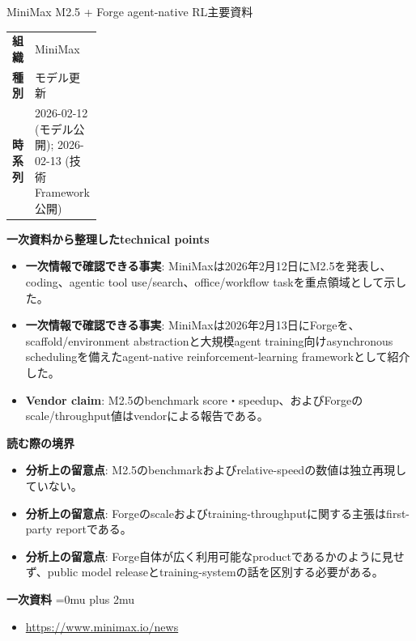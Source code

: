 \begin{technicalnote}{MiniMax M2.5 + Forge agent-native RL}{主要資料}
\begingroup
\begin{tabularx}{\linewidth}{@{}>{\bfseries}p{0.22\linewidth}X@{}}
組織 & MiniMax \\
種別 & モデル更新 \\
時系列 & 2026-02-12 (モデル公開); 2026-02-13 (技術Framework公開) \\
\end{tabularx}
\smallskip
{\bfseries 一次資料から整理したtechnical points}
\begin{itemize}[leftmargin=1.5em,itemsep=0.35em]
\item \textbf{一次情報で確認できる事実}: MiniMaxは2026年2月12日にM2.5を発表し、coding、agentic tool use/search、office/workflow taskを重点領域として示した。
\item \textbf{一次情報で確認できる事実}: MiniMaxは2026年2月13日にForgeを、scaffold/environment abstractionと大規模agent training向けasynchronous schedulingを備えたagent-native reinforcement-learning frameworkとして紹介した。
\item \textbf{Vendor claim}: M2.5のbenchmark score・speedup、およびForgeのscale/throughput値はvendorによる報告である。
\end{itemize}
\begin{minipage}{\linewidth}
{\bfseries 読む際の境界}
\begin{itemize}[leftmargin=1.5em,itemsep=0.35em]
\item \textbf{分析上の留意点}: M2.5のbenchmarkおよびrelative-speedの数値は独立再現していない。
\item \textbf{分析上の留意点}: Forgeのscaleおよびtraining-throughputに関する主張はfirst-party reportである。
\item \textbf{分析上の留意点}: Forge自体が広く利用可能なproductであるかのように見せず、public model releaseとtraining-systemの話を区別する必要がある。
\end{itemize}
\begin{samepage}
{\bfseries 一次資料}
\begingroup\sloppy
\Urlmuskip=0mu plus 2mu\relax
\begin{itemize}[leftmargin=1.5em,itemsep=0.25em]
\item {\scriptsize\url{https://www.minimax.io/news}}
\end{itemize}
\endgroup
\end{samepage}
\end{minipage}
\endgroup
\end{technicalnote}
\medskip

